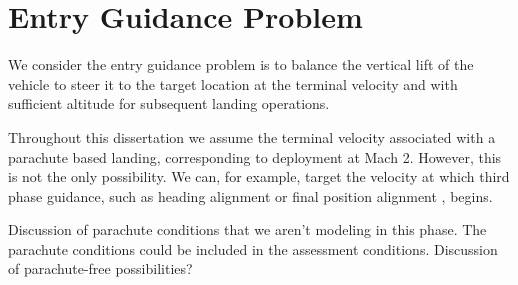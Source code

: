 \chapter{Entry Guidance Problem}
We consider the entry guidance problem is to balance the vertical lift of the vehicle to steer it to the target location at the terminal velocity and with sufficient altitude for subsequent landing operations. 

Throughout this dissertation we assume the terminal velocity associated with a parachute based landing, corresponding to deployment at Mach 2. However, this is not the only possibility. We can, for example, target the velocity at which third phase guidance, such as heading alignment \cite{MSL_EDL2} or final position alignment \cite{GuangfeiDissertation}, begins. 

Discussion of parachute conditions that we aren't modeling in this phase. The parachute conditions could be included in the assessment conditions. Discussion of parachute-free possibilities? 




